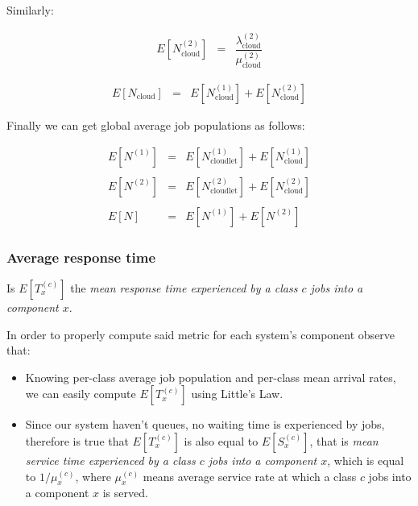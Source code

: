 \documentclass[10pt,a4paper]{article}
\begin{document}
Similarly:
 
\begin{equation}
\label{eq:cloudAveragePopulation2}
\begin{array} {rcl} 
E[N_{\text{cloud}}^{(2)}] & = & \dfrac{\lambda_{\text{cloud}}^{(2)}}{\mu_{\text{cloud}}^{(2)}}
\end{array}
\end{equation}

\begin{equation}
\label{eq:cloudAveragePopulation3}
\begin{array} {rcl} 
E[N_{\text{cloud}}] & = & E[N_{\text{cloud}}^{(1)}] + E[N_{\text{cloud}}^{(2)}]
\end{array}
\end{equation}

Finally we can get global average job populations as follows:

\begin{equation}
\label{eq:AveragePopulation}
\begin{array} {rcl} 

E[N^{(1)}] & = & E[N_{\text{cloudlet}}^{(1)}] + E[N_{\text{cloud}}^{(1)}] \\\\

E[N^{(2)}] & = & E[N_{\text{cloudlet}}^{(2)}] + E[N_{\text{cloud}}^{(2)}] \\\\

E[N] & = & E[N^{(1)}] + E[N^{(2)}]

\end{array}
\end{equation}


\subsubsection{Average response time}

Is $E[T_x^{(c)}]$ the \textit{mean response time experienced by a class $c$ jobs into a component $x$}. 

In order to properly compute said metric for each system's component observe that:
\begin{itemize}
\item Knowing per-class average job population and per-class mean arrival rates, we can easily compute $E[T_x^{(c)}]$ using Little’s Law.
\item Since our system haven't queues, no waiting time is experienced by jobs, therefore is true that $E[T_x^{(c)}]$ is also equal to $E[S_x^{(c)}]$, that is \textit{mean service time experienced by a class $c$ jobs into a component $x$}, which is equal to $1/\mu_x^{(c)}$, where $\mu_x^{(c)}$ means average service rate at which a class $c$ jobs into a component $x$ is served.
\end{itemize}
\end{document}
